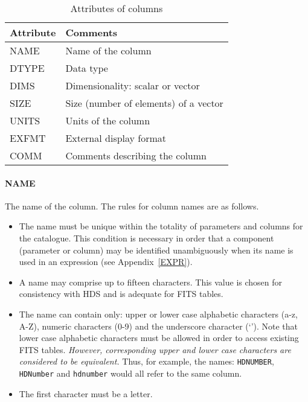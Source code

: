 \documentclass[twoside,11pt]{article}
\renewcommand{\_}{\texttt{\symbol{95}}}
\begin{document}
\begin{table}[htbp]

\begin{center}
\begin{tabular}{ll}
Attribute  & Comments                              \\ \hline
NAME       & Name of the column                    \\
DTYPE      & Data type                             \\
DIMS       & Dimensionality: scalar or vector      \\
SIZE       & Size (number of elements) of a vector \\
UNITS      & Units of the column                   \\
EXFMT      & External display format               \\
COMM       & Comments describing the column        \\
\end{tabular}
\end{center}

\caption{Attributes of columns\label{COLUMN_ATT} }

\end{table}

\paragraph{NAME}
The name of the column. The rules for column names are as follows.

\begin{itemize}

  \item The name must be unique within the totality of parameters and 
   columns for the catalogue. This condition is necessary in order that 
   a component (parameter or column) may be identified unambiguously 
   when its name is used in an expression (see Appendix~\ref{EXPR}).

  \item A name may comprise up to fifteen characters. This value is chosen 
   for consistency with HDS and is adequate for FITS tables.

  \item The name can contain only: upper or lower case alphabetic 
   characters (a-z, A-Z), numeric characters (0-9) and the underscore 
   character (`\_'). Note that lower case alphabetic characters must
   be allowed in order to access existing FITS tables. {\it However,
   corresponding upper and lower case characters are considered to be
   equivalent.} Thus, for example, the names: {\tt HD\_NUMBER}, {\tt
   HD\_Number} and {\tt hd\_number} would all refer to the same column.

  \item The first character must be a letter.
  
\end{itemize}
\end{document}
